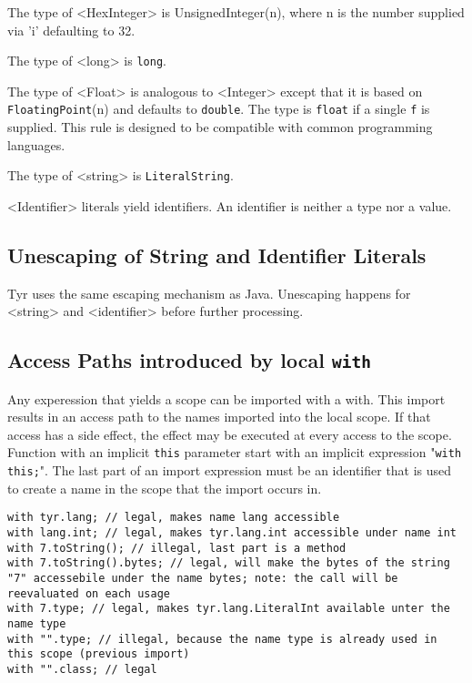 The type of <HexInteger> is UnsignedInteger(n), where n is the number supplied via 'i' defaulting to 32.

The type of <long> is \texttt{long}.

The type of <Float> is analogous to <Integer> except that it is based on \texttt{FloatingPoint}(n) and defaults to \texttt{double}.
The type is \texttt{float} if a single \texttt{f} is supplied.
This rule is designed to be compatible with common programming languages.

The type of <string> is \texttt{LiteralString}.

<Identifier> literals yield identifiers.
An identifier is neither a type nor a value.

\subsection{Unescaping of String and Identifier Literals}

Tyr uses the same escaping mechanism as Java.
Unescaping happens for <string> and <identifier> before further processing.


\subsection{Access Paths introduced by local \texttt{with}}

Any experession that yields a scope can be imported with a with.
This import results in an access path to the names imported into the local scope.
If that access has a side effect, the effect may be executed at every access to the scope.
Function with an implicit \texttt{this} parameter start with an implicit expression "\texttt{with this;}".
The last part of an import expression must be an identifier that is used to create a name in the scope that the import occurs in.

\begin{lstlisting}[language=tyr]
with tyr.lang; // legal, makes name lang accessible
with lang.int; // legal, makes tyr.lang.int accessible under name int
with 7.toString(); // illegal, last part is a method
with 7.toString().bytes; // legal, will make the bytes of the string "7" accessebile under the name bytes; note: the call will be reevaluated on each usage
with 7.type; // legal, makes tyr.lang.LiteralInt available unter the name type
with "".type; // illegal, because the name type is already used in this scope (previous import)
with "".class; // legal
\end{lstlisting}


